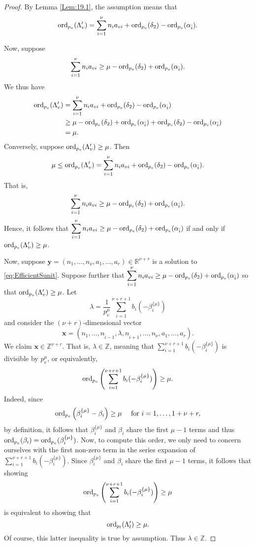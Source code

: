\begin{proof}
By Lemma \ref{Lem:19.1}, the assumption means that 
\[\operatorname{ord}_{p_v}(\Lambda_v') = \sum_{i = 1}^{\nu} n_{i}a_{vi} + \operatorname{ord}_{p_v}(\delta_2) - \operatorname{ord}_{p_v}(\alpha_{\hat{i}}).\]

Now, suppose 
\[\sum_{i = 1}^{\nu} n_{i}a_{vi}  \geq \mu - \operatorname{ord}_{p_v}(\delta_2) + \operatorname{ord}_{p_v}(\alpha_{\hat{i}}).\]
We thus have
\begin{align*}
\operatorname{ord}_{p_v}(\Lambda_v')	
	& = \sum_{i = 1}^{\nu} n_{i}a_{vi} + \operatorname{ord}_{p_v}(\delta_2) - \operatorname{ord}_{p_v}(\alpha_{\hat{i}})\\
	& \geq  \mu - \operatorname{ord}_{p_v}(\delta_2) + \operatorname{ord}_{p_v}(\alpha_{\hat{i}}) + \operatorname{ord}_{p_v}(\delta_2) - \operatorname{ord}_{p_v}(\alpha_{\hat{i}})\\	
	& = \mu.
\end{align*}
Conversely, suppose $\operatorname{ord}_{p_v}(\Lambda_v') \geq \mu$. Then
\[\mu \leq \operatorname{ord}_{p_v}(\Lambda_v') = \sum_{i = 1}^{\nu} n_{i}a_{vi} + \operatorname{ord}_{p_v}(\delta_2) - \operatorname{ord}_{p_v}(\alpha_{\hat{i}}).\]
That is, 
\[\sum_{i = 1}^{\nu} n_{i}a_{vi} \geq \mu - \operatorname{ord}_{p_v}(\delta_2) + \operatorname{ord}_{p_v}(\alpha_{\hat{i}}).\]
Hence, it follows that $\displaystyle \sum_{i = 1}^{\nu} n_{i}a_{vi} \geq \mu - \operatorname{ord}_{p_v}(\delta_2) + \operatorname{ord}_{p_v}(\alpha_{\hat{i}})$ if and only if $\operatorname{ord}_{p_v}(\Lambda_v') \geq \mu$.

Now, suppose $\mathbf{y}= (n_1, \dots, n_{\nu}, a_1, \dots, a_r) \in \mathbb{R}^{\nu + r}$ is a solution to \eqref{eq:EfficientSunit}. Suppose further that $\displaystyle \sum_{i = 1}^{\nu} n_{i}a_{vi} \geq \mu - \operatorname{ord}_{p_v}(\delta_2) + \operatorname{ord}_{p_v}(\alpha_{\hat{i}})$ so that $\operatorname{ord}_{p_v}(\Lambda_v') \geq \mu$. Let
\[\lambda = \frac{1}{p_v^{\mu}}\sum_{i = 1}^{\nu + r + 1}b_i(-\beta_i^{\{\mu\}})\]
and consider the $(\nu + r)$-dimensional vector
\[\mathbf{x}= (n_1, \dots, n_{\hat{i} -1}, \lambda, n_{\hat{i} +1}, \dots, n_{\nu}, a_1, \dots, a_r).\]
We claim $\mathbf{x} \in \mathbb{Z}^{\nu + r}$. That is, $\lambda \in \mathbb{Z}$, meaning that $\sum_{i = 1}^{\nu + r + 1}b_i(-\beta_i^{\{\mu\}})$ is divisible by $p_v^{\mu}$, or equivalently, 
\[\operatorname{ord}_{p_v}\left(\sum_{i = 1}^{\nu + r + 1}b_i(-\beta_i^{\{\mu\}})\right) \geq \mu.\]
Indeed, since 
\[\operatorname{ord}_{p_{v}}\left(\beta_{i}^{\{\mu\}}-\beta_{i}\right) \geq \mu \quad \text { for } i=1, \dots, 1+\nu+r,\]
by definition, it follows that $\beta_{i}^{\{\mu\}}$ and $\beta_{i}$ share the first $\mu - 1$ terms and thus $\operatorname{ord}_{p_v}(\beta_i) = \operatorname{ord}_{p_v}(\beta_i^{\{\mu\}})$.
Now, to compute this order, we only need to concern ourselves with the first non-zero term in the series expansion of $\sum_{i = 1}^{\nu + r + 1}b_i(-\beta_i^{\{\mu\}})$. Since $\beta_{i}^{\{\mu\}}$ and $\beta_{i}$ share the first $\mu - 1$ terms, it follows that showing
\[\operatorname{ord}_{p_v}\left(\sum_{i = 1}^{\nu + r + 1}b_i(-\beta_i^{\{\mu\}})\right) \geq \mu\]
is equivalent to showing that 
\[\operatorname{ord}_{p_l}(\Lambda_l') \geq \mu.\]
Of course, this latter inequality is true by assumption. Thus $\lambda \in \mathbb{Z}$. 


\end{proof}
